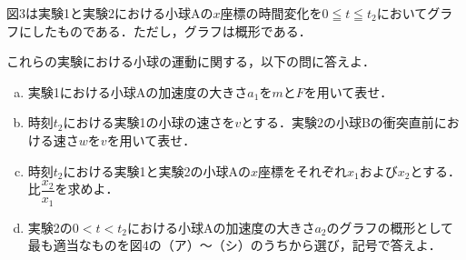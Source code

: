 \begin{enumerate}[label={〔\Alph*〕}]
  {\hzw}図3は実験1と実験2における小球Aの$x$座標の時間変化を$0 \leqq t \leqq t_2$においてグラフにしたものである．ただし，グラフは概形である．

  {\hzw}これらの実験における小球の運動に関する，以下の問に答えよ．

  \begin{enumerate}[(a), resume]
    \item {\hzw}実験1における小球Aの加速度の大きさ$a_1$を$m$と$F$を用いて表せ．
    \item {\hzw}時刻$t_2$における実験1の小球の速さを$v$とする．実験2の小球Bの衝突直前における速さ$w$を$v$を用いて表せ．
    \item {\hzw}時刻$t_2$における実験1と実験2の小球Aの$x$座標をそれぞれ$x_1$および$x_2$とする．比$\dfrac{x_2}{x_1}$を求めよ．
    \item {\hzw}実験2の$0 < t < t_2$における小球Aの加速度の大きさ$a_2$のグラフの概形として最も適当なものを図4の（ア）〜（シ）のうちから選び，記号で答えよ．
  \end{enumerate}
\end{enumerate}


